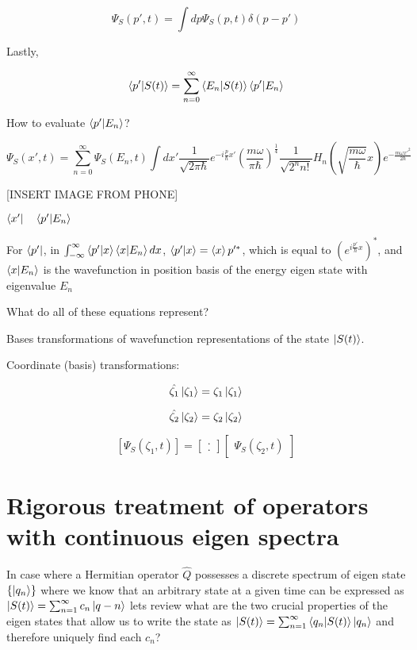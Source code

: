 \documentclass{article}
\begin{document}
$$\Psi_S(p',t) = \int dp \Psi_{S} ( p, t) \delta(p - p')$$

Lastly, 

$$\braket{p'|S(t)} = \sum_{n=0}^\infty \braket{E_n|S(t)} \braket{p'|E_n}$$

How to evaluate $\braket{p'|E_n}$?

$$\Psi_S(x',t) = \sum_{n=0}^\infty \Psi_{S}(E_n, t) \int dx' \frac{1}{\sqrt{2 \pi \hbar}} e^{-i \frac{p}{\hbar} x'} \left( \frac{m \omega}{\pi \hbar}\right)^\frac{1}{4} \frac{1}{\sqrt{2^n n!}} H_n \left( \sqrt{\frac{m \omega}{\hbar}} x \right) e^{- \frac{m \omega x'^2}{2 \hbar}}$$

[INSERT IMAGE FROM PHONE]


\hfill

$\bra{x'} \quad \braket{p'|E_n}$

For $\bra{p'}$, in $\int_{- \infty}^\infty  \braket{p'|x} \braket{x|E_n} dx$, $\braket{p'|x} = \braket{x}p'^*$, which is equal to $\left( e^{i \frac{p'}{\hbar} x} \right)^*$, and $\braket{x|E_n}$ is the wavefunction in position basis of the energy eigen state with eigenvalue $E_n$

What do all of these equations represent?

Bases transformations of wavefunction representations of the state $\ket{S(t)}$. 

Coordinate (basis) transformations:

$$\hat{\zeta_1} \ket{\zeta_1} = \zeta_1 \ket{\zeta_1}$$

$$\hat{\zeta_2} \ket{\zeta_2} = \zeta_2 \ket{\zeta_2}$$

$$\left[ \Psi_S(\zeta_1,t) \right] = \begin{bmatrix} . \\ . \end{bmatrix}  \begin{bmatrix} \Psi_S(\zeta_2,t) \end{bmatrix}$$


\section{Rigorous treatment of operators with continuous eigen spectra}

In case where a Hermitian operator $\hat{Q}$ possesses a discrete spectrum of eigen state $\{\ket{q_n}\}$ where we know that an arbitrary state at a given time can be expressed as $\ket{S(t)} = \sum_{n=1}^\infty c_n \ket{q-n}$ lets review what are the two crucial properties of the eigen states that allow us to write the state as  $\ket{S(t)} = \sum_{n=1}^\infty \braket{q_n | S(t)} \ket{q_n}$ and therefore uniquely find each $c_n$?
\end{document}
